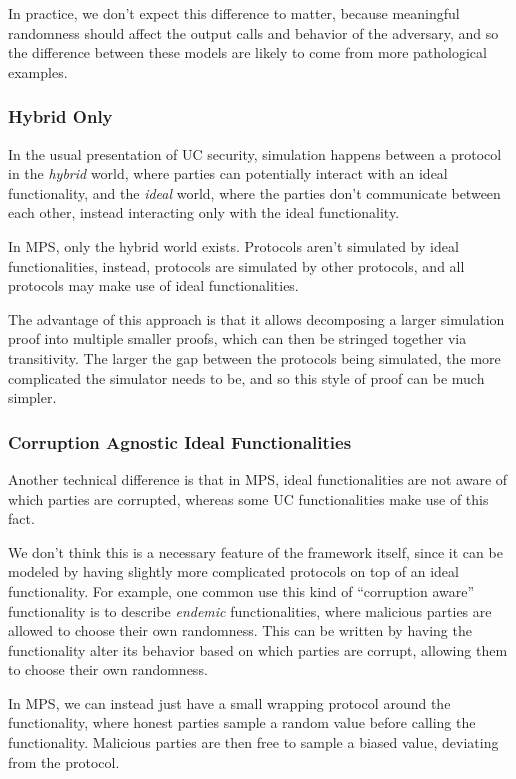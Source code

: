 In practice, we don't expect this difference to matter,
because meaningful randomness should affect the output
calls and behavior of the adversary,
and so the difference between these models are likely
to come from more pathological examples.

\subsubsection*{Hybrid Only}

In the usual presentation of UC security, simulation
happens between a protocol in the \emph{hybrid} world,
where parties can potentially interact with an ideal functionality,
and the \emph{ideal} world, where the parties
don't communicate between each other, instead interacting
only with the ideal functionality.

In MPS, only the hybrid world exists.
Protocols aren't simulated by ideal functionalities,
instead, protocols are simulated by other protocols,
and all protocols may make use of ideal functionalities.

The advantage of this approach is that it allows decomposing
a larger simulation proof into multiple smaller proofs,
which can then be stringed together via transitivity.
The larger the gap between the protocols being simulated,
the more complicated the simulator needs to be,
and so this style of proof can be much simpler.

\subsubsection*{Corruption Agnostic Ideal Functionalities}

Another technical difference is that in MPS,
ideal functionalities are not aware of which parties are corrupted,
whereas some UC functionalities make use of this fact.

We don't think this is a necessary feature of the framework itself,
since it can be modeled by having slightly more complicated
protocols on top of an ideal functionality.
For example, one common use this kind of ``corruption aware''
functionality is to describe \emph{endemic} functionalities,
where malicious parties are allowed to choose their own randomness.
This can be written by having the functionality alter its behavior
based on which parties are corrupt, allowing them to choose their
own randomness.

In MPS, we can instead just have a small wrapping
protocol around the functionality, where honest parties
sample a random value before calling the functionality.
Malicious parties are then free to sample a biased value,
deviating from the protocol.

